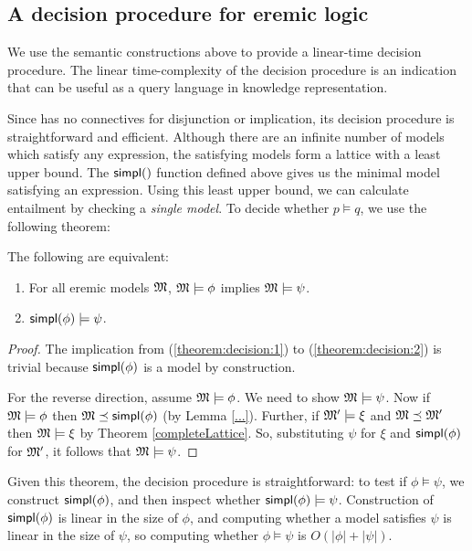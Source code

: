 \subsection{A decision procedure for eremic logic}\label{decisionprocedure}

We use the semantic constructions above to provide a linear-time decision procedure.  
The linear time-complexity of the decision procedure is an indication that \ELABR{} can be useful as a
query language in knowledge representation. 

\NI Since \ELABR{} has no connectives for disjunction or implication, its
decision procedure is straightforward and efficient.  Although there
are an infinite number of models which satisfy any expression, the
satisfying models form a lattice with a least upper bound.  The $\SIMPL$
function defined above gives us the minimal model satisfying an
expression.  Using this least upper bound, we can calculate entailment
by checking a \emph{single model}.  To decide whether $p \models q$,
we use the following theorem:

\begin{theorem}\label{theorem:decision}
  The following are equivalent:
  \begin{enumerate}
    \item\label{theorem:decision:1} For all eremic models $\frak{M}$,
      $\frak{M} \models \phi$ implies $\frak{M} \models \psi$.
    \item\label{theorem:decision:2} $\mathsf{simpl}(\phi) \models \psi$.
  \end{enumerate}
\end{theorem}

\begin{proof}
The implication from  (\ref{theorem:decision:1}) to
(\ref{theorem:decision:2}) is trivial because $\mathsf{simpl}(\phi)$ is a model by construction.

For the reverse direction, assume $\frak{M} \models \phi$. We need to show
$\frak{M} \models \psi$.  Now if $\frak{M} \models \phi$ then $\frak{M} \preceq
\mathsf{simpl}(\phi)$ (by Lemma \ref{...}).  Further, if $\frak{M}' \models \xi $
and $\frak{M} \preceq \frak{M}'$ then $\frak{M} \models \xi $ by Theorem
\ref{completeLattice}. So, substituting $\psi$ for $\xi $ and
$\mathsf{simpl}(\phi)$ for $\frak{M}'$, it follows that $\frak{M} \models \psi$.
\end{proof}

\NI Given this theorem, the decision procedure is straightforward: to
test if $\phi \models \psi$, we construct $\mathsf{simpl}(\phi)$, and then inspect whether
$\mathsf{simpl}(\phi) \models \psi$.  Construction of $\mathsf{simpl}(\phi)$ is linear in the size of
$\phi$, and computing whether a model satisfies $\psi$ is linear in the size
of $\psi$, so computing whether $\phi \models \psi$ is $O(|\phi|+|\psi|)$.






